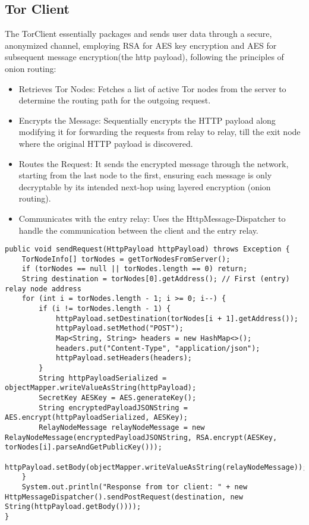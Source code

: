 \documentclass[sigconf]{acmart}
\begin{document}
\subsection{Tor Client}
The TorClient essentially packages and sends user data through a secure, anonymized channel, employing RSA for AES key encryption and AES for subsequent message encryption(the http payload), following the principles of onion routing:
\begin{itemize}
    \item Retrieves Tor Nodes: Fetches a list of active Tor nodes from the server to determine the routing path for the outgoing request.
    \item Encrypts the Message: Sequentially encrypts the HTTP payload along modifying it for forwarding the requests from relay to relay, till the exit node where the original HTTP payload is discovered.
    \item Routes the Request: It sends the encrypted message through the network, starting from the last node to the first, ensuring each message is only decryptable by its intended next-hop using layered encryption (onion routing).
    \item Communicates with the entry relay: Uses the HttpMessage-Dispatcher to handle the communication between the client and the entry relay.
\end{itemize}
\begin{lstlisting}[caption=Tor Client Request Sending]
public void sendRequest(HttpPayload httpPayload) throws Exception {
    TorNodeInfo[] torNodes = getTorNodesFromServer();
    if (torNodes == null || torNodes.length == 0) return;
    String destination = torNodes[0].getAddress(); // First (entry) relay node address
    for (int i = torNodes.length - 1; i >= 0; i--) {
        if (i != torNodes.length - 1) {
            httpPayload.setDestination(torNodes[i + 1].getAddress());
            httpPayload.setMethod("POST");
            Map<String, String> headers = new HashMap<>();
            headers.put("Content-Type", "application/json");
            httpPayload.setHeaders(headers);
        }
        String httpPayloadSerialized = objectMapper.writeValueAsString(httpPayload);
        SecretKey AESKey = AES.generateKey();
        String encryptedPayloadJSONString = AES.encrypt(httpPayloadSerialized, AESKey);
        RelayNodeMessage relayNodeMessage = new RelayNodeMessage(encryptedPayloadJSONString, RSA.encrypt(AESKey, torNodes[i].parseAndGetPublicKey()));
        httpPayload.setBody(objectMapper.writeValueAsString(relayNodeMessage));
    }
    System.out.println("Response from tor client: " + new HttpMessageDispatcher().sendPostRequest(destination, new String(httpPayload.getBody())));
}
\end{lstlisting}
\end{document}
